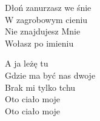 \begin{text}
    Dłoń zanurzasz we śnie\\
    W zagrobowym cieniu\\
    Nie znajdujesz Mnie\\
    Wołasz po imieniu

    A ja leżę tu\\
    Gdzie ma być nas dwoje\\
    Brak mi tylko tchu\\
    Oto ciało moje\\
    Oto ciało moje
\end{text}
\begin{chord}

\end{chord}